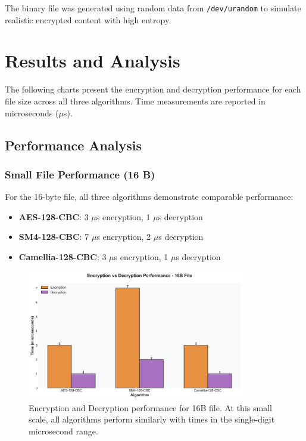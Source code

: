 \documentclass[12pt,a4paper]{article}
\begin{document}
The binary file was generated using random data from \texttt{/dev/urandom} to simulate realistic encrypted content with high entropy.

\newpage

\section{Results and Analysis}

The following charts present the encryption and decryption performance for each file size across all three algorithms. Time measurements are reported in microseconds ($\mu$s).

\subsection{Performance Analysis}

\subsubsection{Small File Performance (16 B)}
For the 16-byte file, all three algorithms demonstrate comparable performance:
\begin{itemize}
    \item \textbf{AES-128-CBC}: 3 $\mu$s encryption, 1 $\mu$s decryption
    \item \textbf{SM4-128-CBC}: 7 $\mu$s encryption, 2 $\mu$s decryption
    \item \textbf{Camellia-128-CBC}: 3 $\mu$s encryption, 1 $\mu$s decryption
\end{itemize}

\begin{figure}[h]
\centering
\includegraphics[width=0.85\textwidth]{performance_16B.png}
\caption{Encryption and Decryption performance for 16B file. At this small scale, all algorithms perform similarly with times in the single-digit microsecond range.}
\label{fig:perf_16b}
\end{figure}
\end{document}

